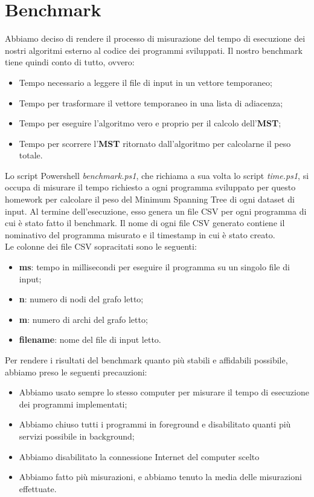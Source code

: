 \section{Benchmark}
\label{cap:benchmark-process}

Abbiamo deciso di rendere il processo di misurazione del tempo di esecuzione dei nostri algoritmi esterno al codice dei programmi sviluppati.
Il nostro benchmark tiene quindi conto di tutto, ovvero:

\begin{itemize}
    \item Tempo necessario a leggere il file di input in un vettore temporaneo;
    \item Tempo per trasformare il vettore temporaneo in una lista di adiacenza;
    \item Tempo per eseguire l'algoritmo vero e proprio per il calcolo dell'\textbf{MST};
    \item Tempo per scorrere l'\textbf{MST} ritornato dall'algoritmo per calcolarne il peso totale.
\end{itemize}

\noindent Lo script Powershell \textit{benchmark.ps1}, che richiama a sua volta lo script \textit{time.ps1}, si occupa di misurare il tempo richiesto a ogni programma sviluppato per questo homework per calcolare il peso del Minimum Spanning Tree di ogni dataset di input. Al termine dell'esecuzione, esso genera un file CSV per ogni programma di cui è stato fatto il benchmark. Il nome di ogni file CSV generato contiene il nominativo del programma misurato e il timestamp in cui è stato creato. \\

\noindent Le colonne dei file CSV sopracitati sono le seguenti:

\begin{itemize}
    \item \textbf{ms}: tempo in millisecondi per eseguire il programma su un singolo file di input;
    \item \textbf{n}: numero di nodi del grafo letto;
    \item \textbf{m}: numero di archi del grafo letto;
    \item \textbf{filename}: nome del file di input letto.
\end{itemize}

\noindent Per rendere i risultati del benchmark quanto più stabili e affidabili possibile, abbiamo preso le seguenti precauzioni:

\begin{itemize}
    \item Abbiamo usato sempre lo stesso computer per misurare il tempo di esecuzione dei programmi implementati;
    \item Abbiamo chiuso tutti i programmi in foreground e disabilitato quanti più servizi possibile in background;
    \item Abbiamo disabilitato la connessione Internet del computer scelto
    \item Abbiamo fatto più misurazioni, e abbiamo tenuto la media delle misurazioni effettuate.
\end{itemize}
